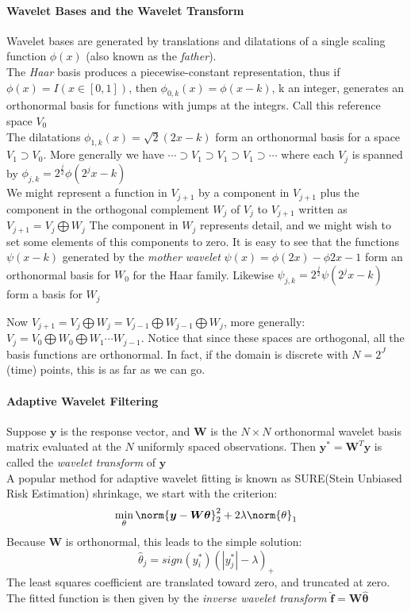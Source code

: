 \paragraph{Wavelet Bases and the Wavelet Transform}
Wavelet bases are generated by translations and dilatations of a single scaling function
$\phi(x)$ (also known as the \textit{father}).\\
The \textit{Haar} basis produces a piecewise-constant representation, thus if $\phi(x)=I(x\in
[0,1])$, then $\phi_{0,k}(x) = \phi(x-k)$, k an integer, generates an orthonormal basis for 
functions with jumps at the integrs. Call this reference space $V_{0}$\\
The dilatations $\phi_{1,k}(x)=\sqrt{2}(2x-k)$ form an orthonormal basis for a space 
$V_{1} \supset V_{0}$. More generally we have $\cdots \supset V_{1}\supset V_{1}\supset V_{1}
\supset \cdots$ where each $V_{j}$ is spanned by $\phi_{j,k}=2^{\frac{j}{2}}\phi(2^{j}x-k)$\\
We might represent a function in $V_{j+1}$ by a component in $V_{j+1}$ plus the component in
the orthogonal complement $W_{j}$ of $V_{j}$ to $V_{j+1}$ written as $V_{j+1}= V_{j}\bigoplus W_{j}$
The component in $W_{j}$ represents detail, and we might wish to set some elements of this 
components to zero. It is easy to see that the functions $\psi(x-k)$ generated by the 
\textit{mother wavelet} $\psi(x)=\phi(2x)-\phi{2x-1}$ form an orthonormal basis for $W_{0}$ for
the Haar family. Likewise $\psi_{j,k}=2^{\frac{j}{2}}\psi(2^{j}x-k)$ form a basis for $W_{j}$

Now $V_{j+1}=V_{j}\bigoplus W_{j} = V_{j-1}\bigoplus W_{j-1} \bigoplus W_{j}$, more generally:
$V_{j} = V_{0} \bigoplus W_{0} \bigoplus W_{1}\cdots W_{j-1}$. Notice that since these spaces
are orthogonal, all the basis functions are orthonormal. In fact, if the domain is discrete with 
$N=2^{J}$ (time) points, this is as far as we can go. 

\paragraph{Adaptive Wavelet Filtering}
Suppose $\bm{y}$ is the response vector, and $\bm{W}$ is the $N\times N$ orthonormal wavelet
basis matrix evaluated at the $N$ uniformly spaced observations. Then $\bm{y}^{*}=\bm{W}^{T}\bm{y}$
is called the \textit{wavelet transform} of $\bm{y}$\\
A popular method for adaptive wavelet fitting is known as SURE(Stein Unbiased Risk Estimation)
shrinkage, we start with the criterion:
$$ \min\limits_{\theta}\norm{\bm{y}-\bm{W}\bm{\theta}}_{2}^{2} + 2\lambda\norm{\theta}_{1}$$
Because $\bm{W}$ is orthonormal, this leads to the simple solution:
$$\hat{\theta}_{j} = sign(y_{i}^{*})(|y_{j}^{*}|-\lambda)_{+}$$
The least squares coefficient are translated toward zero, and truncated at zero.
The fitted function is then given by the \textit{inverse wavelet transform} $\hat{\bm{f}}=\bm{W\hat{\theta}}$


